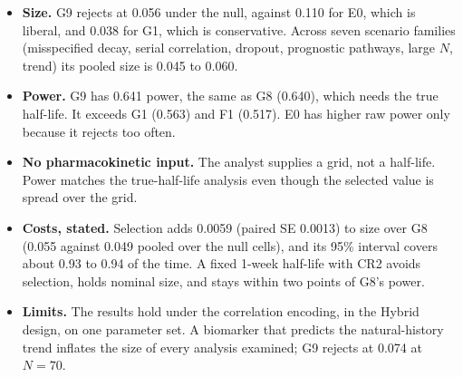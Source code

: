 \documentclass[
  9pt,
]{article}
\providecommand{\tightlist}{%
  \setlength{\itemsep}{0pt}\setlength{\parskip}{0pt}}
\begin{document}
\begin{itemize}
\tightlist
\item
  \textbf{Size.} G9 rejects at 0.056 under the null, against 0.110 for
  E0, which is liberal, and 0.038 for G1, which is conservative. Across
  seven scenario families (misspecified decay, serial correlation,
  dropout, prognostic pathways, large \(N\), trend) its pooled size is
  0.045 to 0.060.
\item
  \textbf{Power.} G9 has 0.641 power, the same as G8 (0.640), which
  needs the true half-life. It exceeds G1 (0.563) and F1 (0.517). E0 has
  higher raw power only because it rejects too often.
\item
  \textbf{No pharmacokinetic input.} The analyst supplies a grid, not a
  half-life. Power matches the true-half-life analysis even though the
  selected value is spread over the grid.
\item
  \textbf{Costs, stated.} Selection adds 0.0059 (paired SE 0.0013) to
  size over G8 (0.055 against 0.049 pooled over the null cells), and its
  95\% interval covers about 0.93 to 0.94 of the time. A fixed 1-week
  half-life with CR2 avoids selection, holds nominal size, and stays
  within two points of G8's power.
\item
  \textbf{Limits.} The results hold under the correlation encoding, in
  the Hybrid design, on one parameter set. A biomarker that predicts the
  natural-history trend inflates the size of every analysis examined; G9
  rejects at 0.074 at \(N=70\).
\end{itemize}
\end{document}

